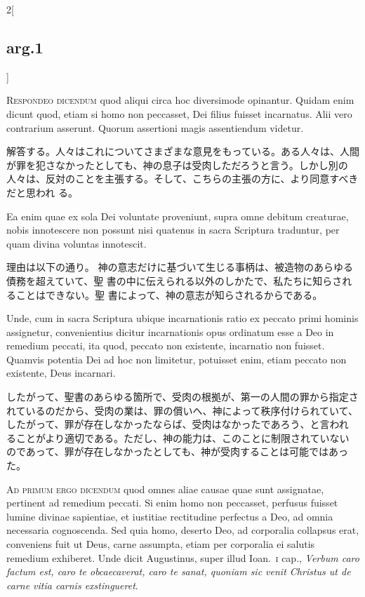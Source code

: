 \documentclass[paper=a4paper,fontsize=10pt,jafontsize=9pt,titlepage]{jlreq}
\begin{document}
\begin{paracol}{2}[\subsection{arg.1}]

{\scshape Respondeo dicendum} quod aliqui circa hoc
diversimode opinantur. Quidam enim dicunt quod, etiam si homo non
peccasset, Dei filius fuisset incarnatus. Alii vero contrarium
asserunt. Quorum assertioni magis assentiendum videtur.

\switchcolumn

解答する。人々はこれについてさまざまな意見をもっている。ある人々は、人間
 が罪を犯さなかったとしても、神の息子は受肉しただろうと言う。しかし別の
 人々は、反対のことを主張する。そして、こちらの主張の方に、より同意すべきだと思われ
 る。

\switchcolumn*

Ea enim quae ex
sola Dei voluntate proveniunt, supra omne debitum creaturae, nobis
innotescere non possunt nisi quatenus in sacra Scriptura traduntur, per
quam divina voluntas innotescit.

\switchcolumn

理由は以下の通り。
神の意志だけに基づいて生じる事柄は、被造物のあらゆる債務を超えていて、聖
 書の中に伝えられる以外のしかたで、私たちに知らされることはできない。聖
 書によって、神の意志が知らされるからである。

\switchcolumn*

Unde, cum in sacra Scriptura ubique
incarnationis ratio ex peccato primi hominis assignetur, convenientius
dicitur incarnationis opus ordinatum esse a Deo in remedium peccati, ita
quod, peccato non existente, incarnatio non fuisset. Quamvis potentia
Dei ad hoc non limitetur, potuisset enim, etiam peccato non existente,
Deus incarnari.

\switchcolumn

したがって、聖書のあらゆる箇所で、受肉の根拠が、第一の人間の罪から指定さ
 れているのだから、受肉の業は、罪の償いへ、神によって秩序付けられていて、
 したがって、罪が存在しなかったならば、受肉はなかったであろう、と言われ
 ることがより適切である。ただし、神の能力は、このことに制限されていない
 のであって、罪が存在しなかったとしても、神が受肉することは可能ではあっ
 た。

\switchcolumn*[\subsection{ad.1}]

{\scshape Ad primum ergo dicendum} quod omnes aliae
causae quae sunt assignatae, pertinent ad remedium peccati. Si enim homo
non peccasset, perfusus fuisset lumine divinae sapientiae, et iustitiae
rectitudine perfectus a Deo, ad omnia necessaria cognoscenda. Sed quia
homo, deserto Deo, ad corporalia collapsus erat, conveniens fuit ut
Deus, carne assumpta, etiam per corporalia ei salutis remedium
exhiberet. Unde dicit Augustinus, super illud Ioan.~{\scshape i} cap., {\itshape Verbum caro
factum est, caro te obcaecaverat, caro te sanat, quoniam sic venit
Christus ut de carne vitia carnis exstingueret}.


\end{paracol}
\end{document}
